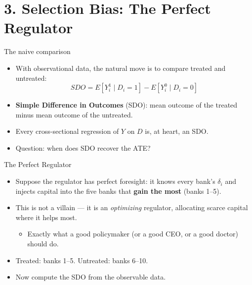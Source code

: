 \documentclass[
  11pt,
  ignorenonframetext,
  aspectratio=169,
]{beamer}
\providecommand{\tightlist}{%
  \setlength{\itemsep}{0pt}\setlength{\parskip}{0pt}}
\begin{document}
\section{3. Selection Bias: The Perfect
Regulator}\label{selection-bias-the-perfect-regulator}

\begin{frame}{The naive comparison}
\protect{}\label{the-naive-comparison}
\begin{itemize}
\tightlist
\item
  With observational data, the natural move is to compare treated and
  untreated: \[
  SDO = E[Y_i^1 \mid D_i = 1] - E[Y_i^0 \mid D_i = 0]
  \]
\item
  \textbf{Simple Difference in Outcomes} (SDO): mean outcome of the
  treated minus mean outcome of the untreated.
\item
  Every cross-sectional regression of \(Y\) on \(D\) is, at heart, an
  SDO.
\item
  Question: when does SDO recover the ATE?
\end{itemize}
\end{frame}

\begin{frame}{The Perfect Regulator}
\protect{}\label{the-perfect-regulator}
\begin{itemize}
\tightlist
\item
  Suppose the regulator has perfect foresight: it knows every bank's
  \(\delta_i\) and injects capital into the five banks that \textbf{gain
  the most} (banks 1--5).
\item
  This is not a villain --- it is an \emph{optimizing} regulator,
  allocating scarce capital where it helps most.

  \begin{itemize}
  \tightlist
  \item
    Exactly what a good policymaker (or a good CEO, or a good doctor)
    should do.
  \end{itemize}
\item
  Treated: banks 1--5. Untreated: banks 6--10.
\item
  Now compute the SDO from the observable data.
\end{itemize}
\end{frame}
\end{document}
